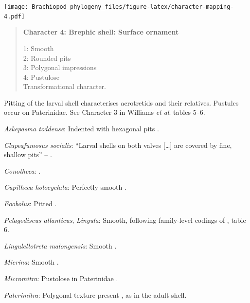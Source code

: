 \documentclass[openany]{book}
\begin{document}
\texttt{[image: Brachiopod\_phylogeny\_files/figure-latex/character-mapping-4.pdf]}

\begin{quote}
\textbf{Character 4: Brephic shell: Surface ornament}

1: Smooth\\
2: Rounded pits\\
3: Polygonal impressions\\
4: Pustulose\\
Transformational character.
\end{quote}

Pitting of the larval shell characterises acrotretids and their
relatives. Pustules occur on Paterinidae. See Character 3 in Williams
\emph{et al}. \citeyearpar{Williams2000LinguliformeaCraniiformea} tables
5--6.

\hypertarget{Askepasma_toddense-coding-4}{}
\emph{Askepasma toddense}: Indented with hexagonal pits \citep[appendix
2]{Williams1998Thediversity}.

\hypertarget{Clupeafumosus_socialis-coding-4}{}
\emph{Clupeafumosus socialis}: ``Larval shells on both valves
{[}\ldots{}{]} are covered by fine, shallow pits'' --
\citet{Topper2013Reappraisalof}.

\hypertarget{Conotheca-coding-4}{}
\emph{Conotheca}: \citep{Wrona2003}.

\hypertarget{Cupitheca_holocyclata-coding-4}{}
\emph{Cupitheca holocyclata}: Perfectly smooth \citep{Skovsted2016}.

\hypertarget{Eoobolus-coding-4}{}
\emph{Eoobolus}: Pitted \citep[table
8]{Williams2000LinguliformeaCraniiformea}.

\hypertarget{Lingula-coding-4}{}
\emph{Pelagodiscus atlanticus}, \emph{Lingula}: Smooth, following
family-level codings of \citet{Williams2000LinguliformeaCraniiformea},
table 6.

\hypertarget{Lingulellotreta_malongensis-coding-4}{}
\emph{Lingulellotreta malongensis}: Smooth
\citep{Holmer1997EarlyCambrian, Li2004}.

\hypertarget{Micrina-coding-4}{}
\emph{Micrina}: Smooth \citep{Holmer2011Firstrecord}.

\hypertarget{Micromitra-coding-4}{}
\emph{Micromitra}: Pustolose in Paterinidae \citep[table
6]{Williams2000LinguliformeaCraniiformea}.

\hypertarget{Paterimitra-coding-4}{}
\emph{Paterimitra}: Polygonal texture present
\citep{Holmer2011Firstrecord}, as in the adult shell.
\end{document}
